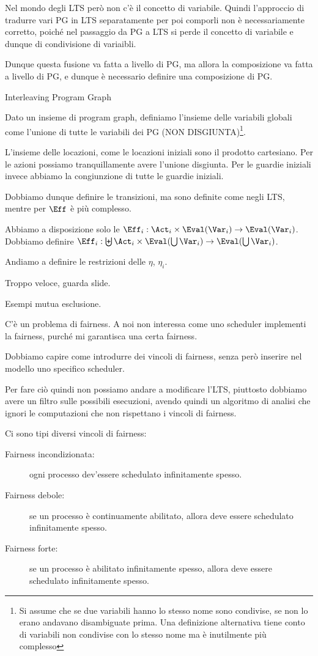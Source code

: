 Nel mondo degli LTS però non c'è il concetto di variabile. Quindi l'approccio di tradurre vari PG in LTS separatamente per poi comporli non è necessariamente corretto, poiché nel passaggio da PG a LTS si perde il concetto di variabile e dunque di condivisione di variaibli.

Dunque questa fusione va fatta a livello di PG, ma allora la composizione va fatta a livello di PG, e dunque è necessario definire una composizione di PG.

Interleaving Program Graph

Dato un insieme di program graph, definiamo l'insieme delle variabili globali come l'unione di tutte le variabili dei PG (NON DISGIUNTA)\footnote{Si assume che se due variabili hanno lo stesso nome sono condivise, se non lo erano andavano disambiguate prima. Una definizione alternativa tiene conto di variabili non condivise con lo stesso nome ma è inutilmente più complesso}.

L'insieme delle locazioni, come le locazioni iniziali sono il prodotto cartesiano. Per le azioni possiamo tranquillamente avere l'unione disgiunta. Per le guardie iniziali invece abbiamo la congiunzione di tutte le guardie iniziali.

Dobbiamo dunque definire le transizioni, ma sono definite come negli LTS, mentre per \(\Eff\) è più complesso.

Abbiamo a disposizione solo le \(\Eff_i: \Act_i \times \Eval(\Var_i)\to \Eval(\Var_i)\). Dobbiamo definire \(\Eff_i:\biguplus \Act_i \times \Eval(\bigcup\Var_i)\to \Eval(\bigcup\Var_i) \).

Andiamo a definire le restrizioni delle \(\eta\), \(\eta_i\).

Troppo veloce, guarda slide.

Esempi mutua esclusione.

C'è un problema di fairness. A noi non interessa come uno scheduler implementi la fairness, purché mi garantisca una certa fairness.

Dobbiamo capire come introdurre dei vincoli di fairness, senza però inserire nel modello uno specifico scheduler.

Per fare ciò quindi non possiamo andare a modificare l'LTS, piuttosto dobbiamo avere un filtro sulle possibili esecuzioni, avendo quindi un algoritmo di analisi che ignori le computazioni che non rispettano i vincoli di fairness.

Ci sono tipi diversi vincoli di fairness:
\begin{description}
  \item[Fairness incondizionata:] ogni processo dev'essere schedulato infinitamente spesso.
  \item[Fairness debole:] se un processo è continuamente abilitato, allora deve essere schedulato infinitamente spesso.
  \item[Fairness forte:] se un processo è abilitato infinitamente spesso, allora deve essere schedulato infinitamente spesso.
\end{description}

